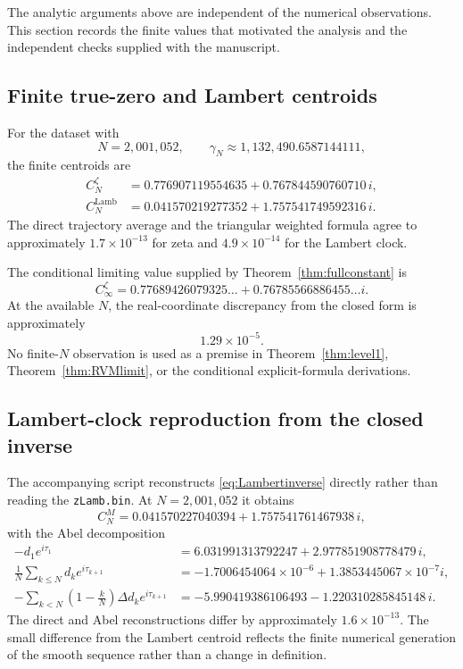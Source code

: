 \documentclass[11pt]{amsart}
\numberwithin{equation}{section}
\theoremstyle{definition}
\theoremstyle{remark}
\begin{document}
The analytic arguments above are independent of the numerical observations. This section records the finite values that motivated the analysis and the independent checks supplied with the manuscript.

\subsection{Finite true-zero and Lambert centroids}
For the dataset with
\[
N=2{,}001{,}052,
\qquad
\gamma_N\approx1{,}132{,}490.6587144111,
\]
the finite centroids are
\begin{align*}
C_N^{\zeta}
&=0.776907119554635+0.767844590760710\,i,\\
C_N^{\mathrm{Lamb}}
&=0.041570219277352+1.757541749592316\,i.
\end{align*}
The direct trajectory average and the triangular weighted formula agree to approximately $1.7\times10^{-13}$ for zeta and $4.9\times10^{-14}$ for the Lambert clock.

The conditional limiting value supplied by Theorem~\ref{thm:fullconstant} is
\[
C_\infty^{\zeta}=0.77689426079325\ldots+0.76785566886455\ldots i.
\]
At the available $N$, the real-coordinate discrepancy from the closed form is approximately
\[
1.29\times10^{-5}.
\]
No finite-$N$ observation is used as a premise in Theorem~\ref{thm:level1}, Theorem~\ref{thm:RVMlimit}, or the conditional explicit-formula derivations.

\subsection{Lambert-clock reproduction from the closed inverse}
The accompanying script  reconstructs \eqref{eq:Lambertinverse} directly rather than reading the \texttt{zLamb.bin}. At $N=2{,}001{,}052$ it obtains
\[
C_N^M
=0.041570227040394+1.757541761467938\,i,
\]
with the Abel decomposition
\begin{align*}
-d_1e^{i\tau_1}
&=6.031991313792247+2.977851908778479\,i,\\
\frac1N\sum_{k\le N}d_ke^{i\tau_{k+1}}
&=-1.7006454064\times10^{-6}+1.3853445067\times10^{-7}i,\\
-\sum_{k<N}\left(1-\frac{k}{N}\right)\Delta d_ke^{i\tau_{k+1}}
&=-5.990419386106493-1.220310285845148\,i.
\end{align*}
The direct and Abel reconstructions differ by approximately $1.6\times10^{-13}$. The small difference from the Lambert centroid reflects the finite numerical generation of the smooth sequence rather than a change in definition.
\end{document}
